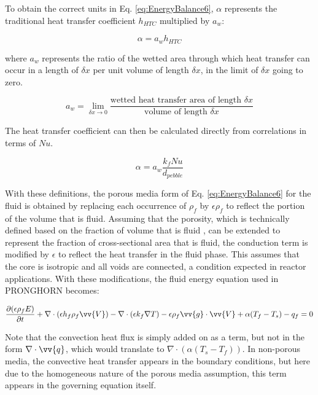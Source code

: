 \documentclass[10pt]{article}
\numberwithin{equation}{section} %
\begin{document}
To obtain the correct units in Eq. \eqref{eq:EnergyBalance6}, \(\alpha\) represents the traditional heat transfer coefficient \(h_{HTC}\) multiplied by \(a_w\):

\begin{equation}
\label{eq:Alpha}
\alpha=a_wh_{HTC}
\end{equation}

where \(a_w\) represents the ratio of the wetted area through which heat transfer can occur in a length of \(\delta x\) per unit volume of length \(\delta x\), in the limit of \(\delta x\) going to zero.

\begin{equation}
\label{eq:AwLimit}
a_w=\lim_{\delta x\to 0} \frac{\text{wetted heat transfer area of length } \delta x}{\text{volume of length }\delta x}
\end{equation}

The heat transfer coefficient can then be calculated directly from correlations in terms of \(Nu\).

\begin{equation}
\label{eq:AlphaNu}
\alpha=a_w\frac{k_f Nu}{d_{pebble}}
\end{equation} %

With these definitions, the porous media form of Eq. \eqref{eq:EnergyBalance6} for the fluid is obtained by replacing each occurrence of \(\rho_f\) by \(\epsilon\rho_f\) to reflect the portion of the volume that is fluid. Assuming that the porosity, which is technically defined based on the fraction of volume that is fluid , can be extended to represent the fraction of cross-sectional area that is fluid, the conduction term is modified by \(\epsilon\) to reflect the heat transfer in the fluid phase. This assumes that the core is isotropic and all voids are connected, a condition expected in reactor applications. With these modifications, the fluid energy equation used in PRONGHORN becomes:

\begin{equation}
\label{eq:EnergyBalance7}
\begin{aligned}
\frac{\partial (\epsilon\rho_f E)}{\partial t}+\nabla\cdot(\epsilon h_f\rho_f\vv{V})-\nabla\cdot(\epsilon k_f\nabla T)-\epsilon\rho_f \vv{g}\cdot\vv{V}+\alpha(T_f-T_s)-q_f=0\\
\end{aligned}
\end{equation}

Note that the convection heat flux is simply added on as a term, but not in the form \(\nabla\cdot\vv{q}\), which would translate to \(\nabla\cdot(\alpha(T_s-T_f))\). In non-porous media, the convective heat transfer appears in the boundary conditions, but here due to the homogeneous nature of the porous media assumption, this term appears in the governing equation itself.
\end{document}
